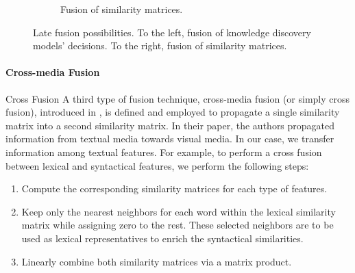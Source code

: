 \begin{figure}
\begin{subfigure}[t]{.5\textwidth}
	\caption{Fusion of similarity matrices.}
	\label{fig:lf2}	
	\end{subfigure}
	\caption{Late fusion possibilities. To the left, fusion of knowledge discovery models' decisions. To the right, fusion of similarity matrices.}
	\label{fig:lf_diag}
\end{figure}




\paragraph{Cross-media  Fusion}{Cross Fusion}
%
A third type of fusion technique, cross-media  fusion (or simply cross fusion),   introduced in \cite{ClinchantAC11,Ah-PineCC15}, is defined and employed to propagate a single similarity matrix into a second similarity matrix. In their paper, the authors propagated information from textual media towards visual media. In our case, we transfer information among textual features. For example, to perform a cross fusion between lexical and syntactical features, we perform the following steps: 
\begin{enumerate}
\item Compute the corresponding similarity matrices for each type of features.
\item Keep only the nearest neighbors for each word within the lexical similarity matrix while assigning zero to the rest.  These selected neighbors are to be used as lexical representatives to enrich the syntactical similarities.
\item Linearly combine both similarity matrices  via a matrix product.
\end{enumerate}  

